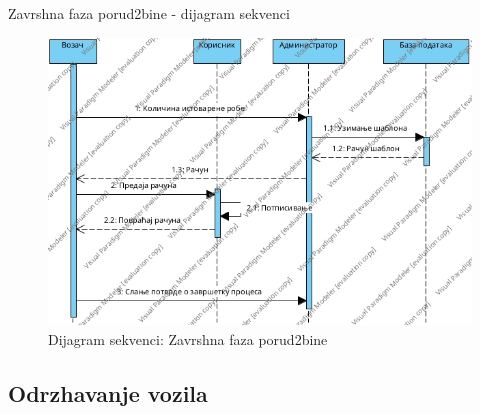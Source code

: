 \documentclass[11pt]{beamer}
\begin{document}
\begin{frame}{Zavrshna faza porud2bine - dijagram sekvenci}
\begin{figure}
    \centering
    \includegraphics[scale=0.4]{Slike/DFD/SUzavrsnaFazaProudzbineSequence Diagram1.jpg}
    \caption{Dijagram sekvenci: Zavrshna faza porud2bine}
    \label{fig:dszfp}
\end{figure}
\end{frame}
\subsection{Odrzhavanje vozila}
\end{document}

